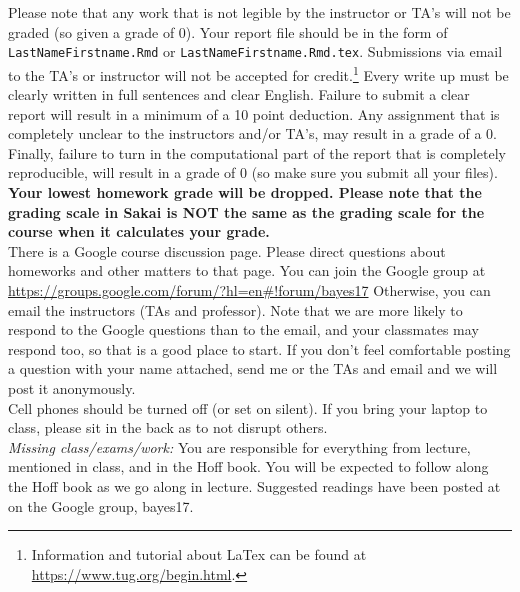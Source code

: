 \documentclass[11pt]{article}
\begin{document}
Please note that any work that is not legible by the instructor or TA's will not be graded (so given a grade of 0). Your report file should be in the form of \texttt{LastNameFirstname.Rmd} or  \texttt{LastNameFirstname.Rmd.tex}. 
Submissions via email to the TA's or instructor will not be accepted for credit.\footnote{Information and tutorial about LaTex can be found at \url{https://www.tug.org/begin.html}.} Every write up must be clearly written in full sentences and clear English. Failure to submit a clear report will result in a minimum of a 10 point deduction. Any assignment that is completely unclear to the instructors and/or TA's, may result in a grade of a 0. Finally, failure to turn in the computational part of the report that is completely reproducible, will result in a grade of 0 (so make sure you submit all your files).    \\









\textbf{Your lowest homework grade will be dropped. Please note that the grading scale in Sakai is NOT the same as the grading scale for the course when it calculates your grade.}\\

There is a Google course discussion page. Please direct questions about homeworks and other matters to that page. You can join the Google group at \url{https://groups.google.com/forum/?hl=en#!forum/bayes17}
Otherwise, you can email the instructors (TAs and professor). Note that we are more likely to respond to the Google questions than to the email, and your classmates may respond too, so that is a good place to start. If you don't feel comfortable posting a question with your name attached, send me or the TAs and email and we will post it anonymously.\\

Cell phones should be turned off (or set on silent). If you bring your laptop to class, please sit in the back as to not disrupt others. \\





\emph{Missing class/exams/work:}
You are responsible for everything from lecture, mentioned in class, and in the Hoff book. You will be expected to follow along the Hoff book as we go along in lecture. Suggested readings have been posted at on the Google group, bayes17.
\end{document}
